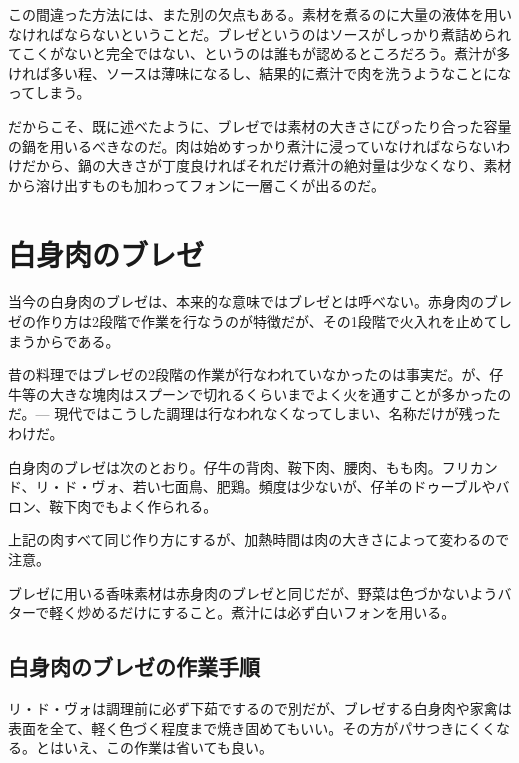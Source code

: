 この間違った方法には、また別の欠点もある。素材を煮るのに大量の液体を用いなければならないということだ。ブレゼというのはソースがしっかり煮詰められてこくがないと完全ではない、というのは誰もが認めるところだろう。煮汁が多ければ多い程、ソースは薄味になるし、結果的に煮汁で肉を洗うようなことになってしまう。

だからこそ、既に述べたように、ブレゼでは素材の大きさにぴったり合った容量の鍋を用いるべきなのだ。肉は始めすっかり煮汁に浸っていなければならないわけだから、鍋の大きさが丁度良ければそれだけ煮汁の絶対量は少なくなり、素材から溶け出すものも加わってフォンに一層こくが出るのだ。

\hypertarget{ux767dux8eabux8089ux306eux30d6ux30ecux30bc}{%
\section{白身肉のブレゼ}\label{ux767dux8eabux8089ux306eux30d6ux30ecux30bc}}

当今の白身肉のブレゼは、本来的な意味ではブレゼとは呼べない。赤身肉のブレゼの作り方は2段階で作業を行なうのが特徴だが、その1段階で火入れを止めてしまうからである。

昔の料理ではブレゼの2段階の作業が行なわれていなかったのは事実だ。が、仔牛等の大きな塊肉はスプーンで切れるくらいまでよく火を通すことが多かったのだ。---
現代ではこうした調理は行なわれなくなってしまい、名称だけが残ったわけだ。

白身肉のブレゼは次のとおり。仔牛の背肉、鞍下肉、腰肉、もも肉。フリカンド、リ・ド・ヴォ、若い七面鳥、肥鶏。頻度は少ないが、仔羊のドゥーブルやバロン、鞍下肉でもよく作られる。

上記の肉すべて同じ作り方にするが、加熱時間は肉の大きさによって変わるので注意。

ブレゼに用いる香味素材は赤身肉のブレゼと同じだが、野菜は色づかないようバターで軽く炒めるだけにすること。煮汁には必ず白いフォンを用いる。

\hypertarget{ux767dux8eabux8089ux306eux30d6ux30ecux30bcux306eux4f5cux696dux624bux9806}{%
\subsection{白身肉のブレゼの作業手順}\label{ux767dux8eabux8089ux306eux30d6ux30ecux30bcux306eux4f5cux696dux624bux9806}}

リ・ド・ヴォは調理前に必ず下茹でするので別だが、ブレゼする白身肉や家禽は表面を全て、軽く色づく程度まで焼き固めてもいい。その方がパサつきにくくなる。とはいえ、この作業は省いても良い。


